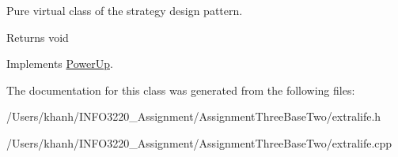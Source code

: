 Pure virtual class of the strategy design pattern. 

\begin{DoxyReturn}{Returns}
void 
\end{DoxyReturn}


Implements \hyperlink{class_power_up}{Power\+Up}.



The documentation for this class was generated from the following files\+:\begin{DoxyCompactItemize}
\item 
/\+Users/khanh/\+I\+N\+F\+O3220\+\_\+\+Assignment/\+Assignment\+Three\+Base\+Two/extralife.\+h\item 
/\+Users/khanh/\+I\+N\+F\+O3220\+\_\+\+Assignment/\+Assignment\+Three\+Base\+Two/extralife.\+cpp\end{DoxyCompactItemize}
